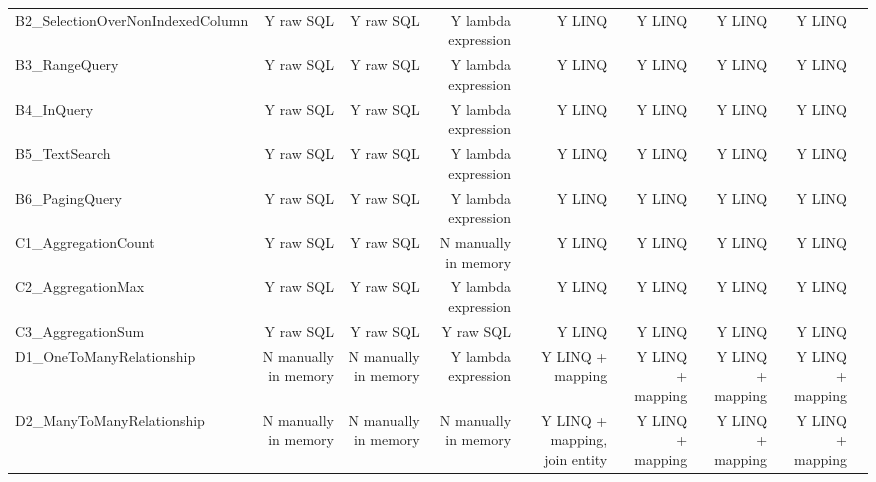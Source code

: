 \begin{landscape}
\begin{adjustwidth}{-2.5 cm}{-2.5 cm}
\begin{threeparttable}[!htb]
\begin{tabular}{lrrrrrrrr}
B2\_SelectionOverNonIndexedColumn &Y raw SQL &Y raw SQL &\cellcolor[HTML]{d9ead3}Y lambda expression &\cellcolor[HTML]{b7e1cd}Y LINQ &\cellcolor[HTML]{b7e1cd}Y LINQ &\cellcolor[HTML]{b7e1cd}Y LINQ &\cellcolor[HTML]{b7e1cd}Y LINQ \\
B3\_RangeQuery &Y raw SQL &Y raw SQL &\cellcolor[HTML]{d9ead3}Y lambda expression &\cellcolor[HTML]{b7e1cd}Y LINQ &\cellcolor[HTML]{b7e1cd}Y LINQ &\cellcolor[HTML]{b7e1cd}Y LINQ &\cellcolor[HTML]{b7e1cd}Y LINQ \\
B4\_InQuery &Y raw SQL &Y raw SQL &\cellcolor[HTML]{d9ead3}Y lambda expression &\cellcolor[HTML]{b7e1cd}Y LINQ &\cellcolor[HTML]{b7e1cd}Y LINQ &\cellcolor[HTML]{b7e1cd}Y LINQ &\cellcolor[HTML]{b7e1cd}Y LINQ \\
B5\_TextSearch &Y raw SQL &Y raw SQL &\cellcolor[HTML]{d9ead3}Y lambda expression &\cellcolor[HTML]{b7e1cd}Y LINQ &\cellcolor[HTML]{b7e1cd}Y LINQ &\cellcolor[HTML]{b7e1cd}Y LINQ &\cellcolor[HTML]{b7e1cd}Y LINQ \\
B6\_PagingQuery &Y raw SQL &Y raw SQL &\cellcolor[HTML]{d9ead3}Y lambda expression &\cellcolor[HTML]{b7e1cd}Y LINQ &\cellcolor[HTML]{b7e1cd}Y LINQ &\cellcolor[HTML]{b7e1cd}Y LINQ &\cellcolor[HTML]{b7e1cd}Y LINQ \\
C1\_AggregationCount &Y raw SQL &Y raw SQL &\cellcolor[HTML]{f4cccc}N manually in memory &\cellcolor[HTML]{b7e1cd}Y LINQ &\cellcolor[HTML]{b7e1cd}Y LINQ &\cellcolor[HTML]{b7e1cd}Y LINQ &\cellcolor[HTML]{b7e1cd}Y LINQ \\
C2\_AggregationMax &Y raw SQL &Y raw SQL &\cellcolor[HTML]{d9ead3}Y lambda expression &\cellcolor[HTML]{b7e1cd}Y LINQ &\cellcolor[HTML]{b7e1cd}Y LINQ &\cellcolor[HTML]{b7e1cd}Y LINQ &\cellcolor[HTML]{b7e1cd}Y LINQ \\
C3\_AggregationSum &Y raw SQL &Y raw SQL &Y raw SQL &\cellcolor[HTML]{b7e1cd}Y LINQ &\cellcolor[HTML]{b7e1cd}Y LINQ &\cellcolor[HTML]{b7e1cd}Y LINQ &\cellcolor[HTML]{b7e1cd}Y LINQ \\
D1\_OneToManyRelationship &\cellcolor[HTML]{f4cccc}N manually in memory &\cellcolor[HTML]{f4cccc}N manually in memory &\cellcolor[HTML]{d9ead3}Y lambda expression &\cellcolor[HTML]{b7e1cd}Y LINQ + mapping &\cellcolor[HTML]{b7e1cd}Y LINQ + mapping &\cellcolor[HTML]{b7e1cd}Y LINQ + mapping &\cellcolor[HTML]{b7e1cd}Y LINQ + mapping \\
D2\_ManyToManyRelationship &\cellcolor[HTML]{f4cccc}N manually in memory &\cellcolor[HTML]{f4cccc}N manually in memory &\cellcolor[HTML]{f4cccc}N manually in memory &\cellcolor[HTML]{b7e1cd}Y LINQ + mapping, join entity &\cellcolor[HTML]{b7e1cd}Y LINQ + mapping &\cellcolor[HTML]{b7e1cd}Y LINQ + mapping &\cellcolor[HTML]{b7e1cd}Y LINQ + mapping \\

\end{tabular}
\end{threeparttable}
\end{adjustwidth}
\end{landscape}
